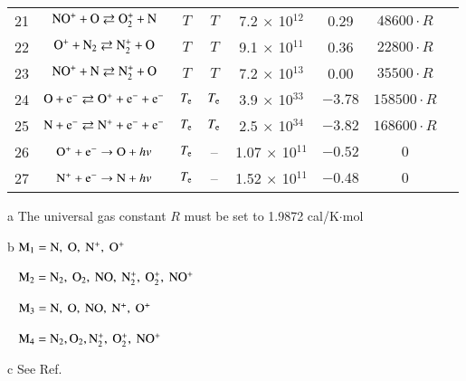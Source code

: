\documentclass{warpdoc}
\begin{document}
\begin{table}[t]
\begin{center}
\begin{threeparttable}
\begin{tabular}{cccccccc}
21 & $\rm NO^+ + O \rightleftarrows O_2^+ + N $ & $T$ & $T$  & 7.2 $\times$ 10$^{12}$  & 0.29 & $48600 \cdot R$ & \cite{book:1990:park}\\

22 & $\rm O^+ + N_2 \rightleftarrows N_2^+ + O $ & $T$ & $T$  & 9.1 $\times$ 10$^{11}$  & 0.36 & $22800 \cdot R$ & \cite{book:1990:park}\\

23 & $\rm NO^+ + N \rightleftarrows N_2^+ + O $ & $T$ & $T$  & 7.2 $\times$ 10$^{13}$  & 0.00 & $35500 \cdot R$ & \cite{book:1990:park}\\


24 & $\rm O + e^- \rightleftarrows O^+ + e^- + e^- $ & $T_{\rm e}$ & $T_{\rm e}$ & 3.9 $\times$ 10$^{33}$  & $-3.78$ & $158500 \cdot R$ & \cite{book:1990:park}\\

25 & $\rm N + e^- \rightleftarrows N^+ + e^- + e^- $ & $T_{\rm e}$ & $T_{\rm e}$ & 2.5 $\times$ 10$^{34}$  & $-3.82$ & $168600 \cdot R$ & \cite{book:1990:park}\\

26 & $\rm O^+ + e^- \rightarrow O + {\it hv} $ & $T_{\rm e}$ & -- & 1.07 $\times$ 10$^{11}$  & $-0.52$ & $0$ & \cite{jtht:1993:park}\\
27 & $\rm N^+ + e^- \rightarrow N + {\it hv} $ & $T_{\rm e}$ & -- & 1.52 $\times$ 10$^{11}$  & $-0.48$ & $0$ & \cite{jtht:1993:park}\\
\bottomrule
\end{tabular}
\begin{tablenotes}
\item[{a}] The universal gas constant $R$ must be set to 1.9872	cal/K$\cdot$mol 
\item[{b}] $\rm M_1=N,~O,~N^+,~O^+$
\item[~] $\rm M_2=N_2,~O_2,~NO,~N_2^+,~O_2^+,~NO^+$
\item[~] $\rm M_3= N,~O,~NO,~N^+,~O^+$
\item[~] $\rm M_4=N_2,O_2,N_2^+,~O_2^+,~NO^+$
\item[{c}] See Ref.\ \cite{jtht:1991:candler}
\end{tablenotes}
\label{tab:boyd}
\end{threeparttable}
\end{center}
\end{table}
%
\end{document}
